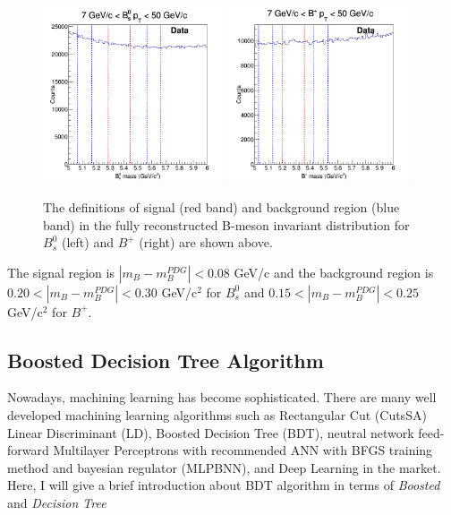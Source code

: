 \begin{figure}[h]
\begin{center}
\includegraphics[width= 0.48\textwidth]{Figures/Chapter4/BsData.png}
\includegraphics[width= 0.48\textwidth]{Figures/Chapter4/BPData.png}
\caption{The definitions of signal (red band) and background region (blue band) in the fully reconstructed B-meson invariant distribution for $B^0_s$ (left) and $B^+$ (right) are shown above.}
\label{SigBackRegion}
\end{center}
\end{figure}

The signal region is $|m_B - m_B^{PDG}| < 0.08$ GeV/c and the background region is $0.20 < |m_B - m_B^{PDG}| < 0.30$ GeV/c$^2$ for $B^0_s$ and $0.15 < |m_B - m_B^{PDG}| < 0.25$ GeV/c$^2$  for $B^+$.


\subsection{Boosted Decision Tree Algorithm}

Nowadays, machining learning has become sophisticated. There are many well developed machining learning algorithms such as Rectangular Cut (CutsSA) Linear Discriminant (LD), Boosted Decision Tree (BDT), neutral network feed-forward Multilayer Perceptrons with recommended ANN with BFGS training method and bayesian regulator (MLPBNN), and Deep Learning in the market. Here, I will give a brief introduction about BDT algorithm in terms of \textit{Boosted} and \textit{Decision Tree}

